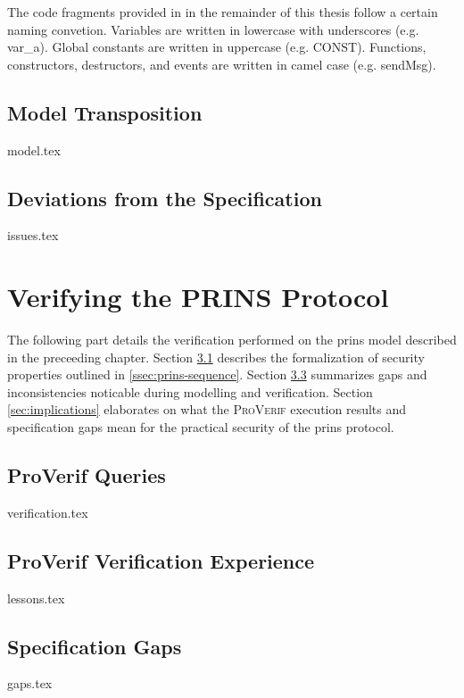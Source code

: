 \documentclass[a4paper,12pt,twoside]{report}
\begin{document}
The code fragments provided in in the remainder of this thesis follow a certain naming convetion.
Variables are written in lowercase with underscores (e.g.  {\sffamily var\_a}).
Global constants are written in uppercase (e.g.  {\sffamily CONST}).
Functions, constructors, destructors, and events are written in camel case (e.g.  {\sffamily sendMsg}).

\section{Model Transposition}
\label{sec:model}
{model.tex}

\section{Deviations from the Specification}
\label{sec:issues}
{issues.tex}

\clearpage

\chapter{Verifying the PRINS Protocol}
\label{chap:verification}

The following part details the verification performed on the \gls{prins} model described in the preceeding chapter.
Section \ref{sec:verification} describes the formalization of security properties outlined in \ref{ssec:prins-sequence}.
Section \ref{sec:gaps} summarizes gaps and inconsistencies noticable during modelling and verification.
Section \ref{sec:implications} elaborates on what the \textsc{ProVerif} execution results and specification gaps mean for the practical security of the  \gls{prins} protocol.

\section{ProVerif Queries}
\label{sec:verification}
{verification.tex}

\section{ProVerif Verification Experience}
\label{sec:lessons}
{lessons.tex}

\section{Specification Gaps}
\label{sec:gaps}
{gaps.tex}
\end{document}
